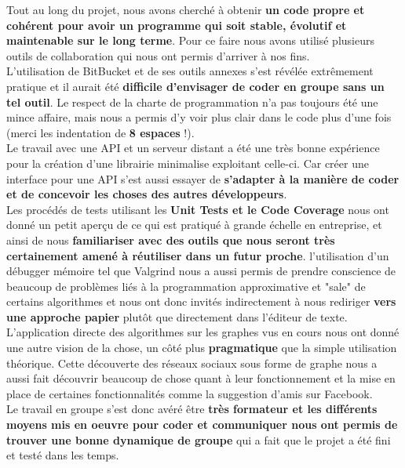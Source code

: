 \documentclass[a4paper, titlepage, oneside]{book}
\begin{document}
Tout au long du projet, nous avons cherché à obtenir \textbf{un code propre et cohérent pour avoir un programme qui soit stable, évolutif et maintenable sur le long terme}. Pour ce faire nous avons utilisé plusieurs outils de collaboration qui nous ont permis d'arriver à nos fins.\\

L'utilisation de BitBucket et de ses outils annexes s'est révélée extrêmement pratique et il aurait été \textbf{difficile d'envisager de coder en groupe sans un tel outil}. Le respect de la charte de programmation n'a pas toujours été une mince affaire, mais nous a permis d'y voir plus clair dans le code plus d'une fois (merci les indentation de \textbf{8 espaces} !).\\
Le travail avec une API et un serveur distant a été une très bonne expérience pour la création d'une librairie minimalise exploitant celle-ci. Car créer une interface pour une API s'est aussi essayer de \textbf{s'adapter à la manière de coder et de concevoir les choses des autres développeurs}.\\

Les procédés de tests utilisant les \textbf{Unit Tests et le Code Coverage} nous ont donné un petit aperçu de ce qui est pratiqué à grande échelle en entreprise, et ainsi de nous \textbf{familiariser avec des outils que nous seront très certainement amené à réutiliser dans un futur proche}. l'utilisation d'un débugger mémoire tel que Valgrind nous a aussi permis de prendre conscience de beaucoup de problèmes liés à la programmation approximative et "sale" de certains algorithmes et nous ont donc invités indirectement à nous rediriger \textbf{vers une approche papier} plutôt que directement dans l'éditeur de texte.\\

L'application directe des algorithmes sur les graphes vus en cours nous ont donné une autre vision de la chose, un côté plus \textbf{pragmatique} que la simple utilisation théorique. Cette découverte des réseaux sociaux sous forme de graphe nous a aussi fait découvrir beaucoup de chose quant à leur fonctionnement et la mise en place de certaines fonctionnalités comme la suggestion d'amis sur Facebook.\\

Le travail en groupe s'est donc avéré être\textbf{ très formateur et les différents moyens mis en oeuvre pour coder et communiquer nous ont permis de trouver une bonne dynamique de groupe} qui a fait que le projet a été fini et testé dans les temps.\\
\end{document}
